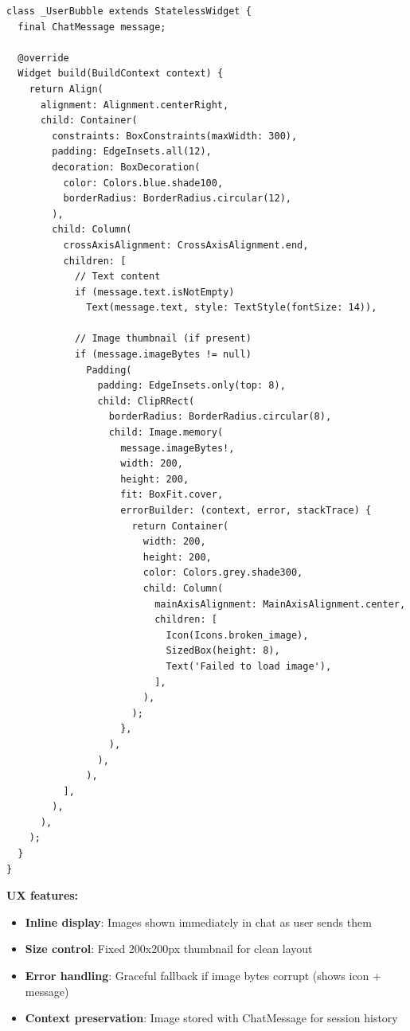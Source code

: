 \documentclass[12pt, twoside]{report}
\begin{document}
\begin{lstlisting}[caption={Image Display in Chat Bubbles --- chat\_bubble.dart}]
class _UserBubble extends StatelessWidget {
  final ChatMessage message;
  
  @override
  Widget build(BuildContext context) {
    return Align(
      alignment: Alignment.centerRight,
      child: Container(
        constraints: BoxConstraints(maxWidth: 300),
        padding: EdgeInsets.all(12),
        decoration: BoxDecoration(
          color: Colors.blue.shade100,
          borderRadius: BorderRadius.circular(12),
        ),
        child: Column(
          crossAxisAlignment: CrossAxisAlignment.end,
          children: [
            // Text content
            if (message.text.isNotEmpty)
              Text(message.text, style: TextStyle(fontSize: 14)),
            
            // Image thumbnail (if present)
            if (message.imageBytes != null)
              Padding(
                padding: EdgeInsets.only(top: 8),
                child: ClipRRect(
                  borderRadius: BorderRadius.circular(8),
                  child: Image.memory(
                    message.imageBytes!,
                    width: 200,
                    height: 200,
                    fit: BoxFit.cover,
                    errorBuilder: (context, error, stackTrace) {
                      return Container(
                        width: 200,
                        height: 200,
                        color: Colors.grey.shade300,
                        child: Column(
                          mainAxisAlignment: MainAxisAlignment.center,
                          children: [
                            Icon(Icons.broken_image),
                            SizedBox(height: 8),
                            Text('Failed to load image'),
                          ],
                        ),
                      );
                    },
                  ),
                ),
              ),
          ],
        ),
      ),
    );
  }
}
\end{lstlisting}

\textbf{UX features:}
\begin{itemize}
    \item \textbf{Inline display}: Images shown immediately in chat as user sends them
    \item \textbf{Size control}: Fixed 200x200px thumbnail for clean layout
    \item \textbf{Error handling}: Graceful fallback if image bytes corrupt (shows icon + message)
    \item \textbf{Context preservation}: Image stored with ChatMessage for session history
\end{itemize}
\end{document}
